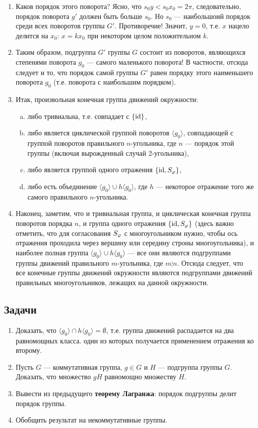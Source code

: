 \begin{enumerate}
\item Каков порядок этого поворота? Ясно, что $s_0y<s_0x_0=2\pi$, следовательно, порядок поворота $g'$ должен быть больше $s_0$. Но $s_0$ --- наибольшоий порядок среди всех поворотов группы $G'$. Противоречие! Значит, $y=0$, т.е. $x$ нацело делится на $x_0$: $x=kx_0$ при некотором целом положительном $k$.
\item Таким образом, подгруппа $G'$ группы $G$ состоит из поворотов, являющихся степенями поворота $g_0$ --- самого маленького поворота! В частности, отсюда следует и то, что порядок самой группы $G'$ равен порядку этого наименьшего поворота $g_0$ (т.е. поворота с наибольшим порядком).
\item Итак, произвольная конечная группа движений окружности:
\begin{enumerate}[a)]
\item либо тривиальна, т.е. совпадает с $\{\mathrm{id}\}$,
\item либо является циклической группой поворотов $\langle g_0\rangle$, совпадающей с группой поворотов правильного $n$-угольника, где $n$ --- порядок этой группы (включая вырожденный случай 2-угольника),
\item либо является группой одного отражения $\{\mathrm{id},S_\varphi\}$,
\item либо есть объединение $\langle g_0\rangle\cup h\langle g_0\rangle$, где $h$ --- некоторое отражение того же самого правильного $n$-угольника.
\end{enumerate}
\item Наконец, заметим, что и тривиальная группа, и циклическая конечная группа поворотов порядка $n$, и группа одного отражения $\{\mathrm{id},S_\varphi\}$ (здесь важно отметить, что для согласования $S_\varphi$ с многоугольником нужно, чтобы ось отражения проходила через вершину или середину строны многоугольника), и наиболее полная группа $\langle g_0\rangle\cup h\langle g_0\rangle$  --- все они являются подгруппами группы движений правильного $m$-угольника, где $m\vdots n$. Отсюда следует, что все конечные группы движений окружности являются подгруппами движений правильных многоугольников, лежащих на данной окружности.
\end{enumerate}

\subsection*{Задачи}
\begin{enumerate}
\item Доказать, что $\langle g_0\rangle\cap h\langle g_0\rangle = \emptyset$, т.е. группа движений распадается на два равномощных класса. один из которых получается применением отражения ко второму.
\item Пусть $G$ --- коммутативная группа, $g\in G$ и $H$ --- подгруппа группы $G$. Доказать, что множество $gH$ равномощно множеству $H$.
\item Вывести из предыдущего \textbf{теорему Лагранжа}: порядок подгруппы делит порядок группы.
\item Обобщить результат на некоммутативные группы.
\end{enumerate}

